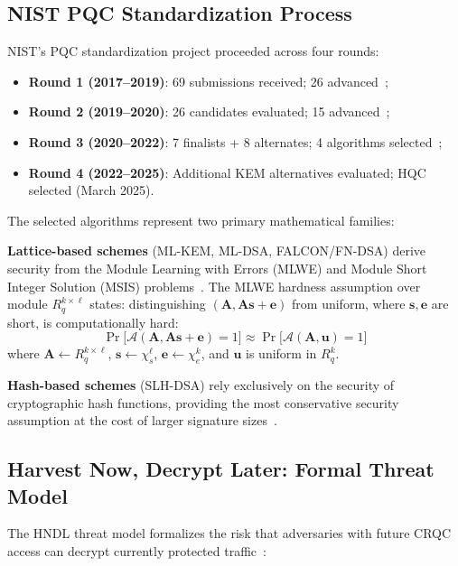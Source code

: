 \documentclass[journal]{IEEEtran}
\begin{document}
\subsection{NIST PQC Standardization Process}

NIST's PQC standardization project proceeded across four rounds:
\begin{itemize}
  \item \textbf{Round 1 (2017--2019)}: 69 submissions received; 26 advanced~\cite{nist2019second};
  \item \textbf{Round 2 (2019--2020)}: 26 candidates evaluated; 15 advanced~\cite{nist2020third};
  \item \textbf{Round 3 (2020--2022)}: 7 finalists + 8 alternates; 4 algorithms selected~\cite{nist2022selected};
  \item \textbf{Round 4 (2022--2025)}: Additional KEM alternatives evaluated; HQC selected (March 2025).
\end{itemize}

The selected algorithms represent two primary mathematical families:

\textbf{Lattice-based schemes} (ML-KEM, ML-DSA, FALCON/FN-DSA) derive security
from the Module Learning with Errors (MLWE) and Module Short Integer Solution
(MSIS) problems~\cite{peikert2009public}. The MLWE hardness assumption over
module $R_q^{k\times\ell}$ states: distinguishing
$(\mathbf{A}, \mathbf{As+e})$ from uniform, where
$\mathbf{s},\mathbf{e}$ are short, is computationally hard:
\begin{equation}
  \Pr\bigl[\mathcal{A}(\mathbf{A},\mathbf{As+e})=1\bigr] \approx
  \Pr\bigl[\mathcal{A}(\mathbf{A},\mathbf{u})=1\bigr]
  \label{eq:mlwe}
\end{equation}
where $\mathbf{A} \leftarrow R_q^{k\times\ell}$, $\mathbf{s} \leftarrow
\chi_s^{\ell}$, $\mathbf{e} \leftarrow \chi_e^k$, and $\mathbf{u}$ is
uniform in $R_q^k$.

\textbf{Hash-based schemes} (SLH-DSA) rely exclusively on the security of
cryptographic hash functions, providing the most conservative security
assumption at the cost of larger signature sizes~\cite{bernstein2019sphincs}.

\subsection{Harvest Now, Decrypt Later: Formal Threat Model}

The HNDL threat model formalizes the risk that adversaries with future CRQC
access can decrypt currently protected traffic~\cite{mosca2018cybersecurity}:
\end{document}

